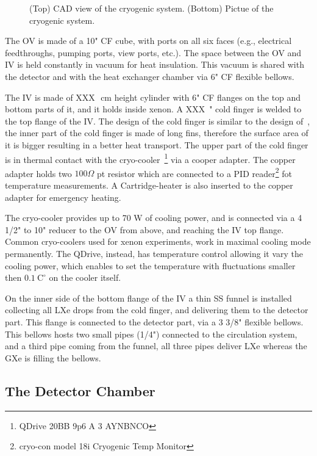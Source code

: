 \begin{figure}
\begin{subfigure}[b]{0.25\textheight}
    \end{subfigure}
        \caption{(Top) CAD view of the cryogenic system. (Bottom) Pictue of the cryogenic system. \label{fig:cryo}}
\end{figure}


The OV is made of a 10" CF cube, with ports on all six faces (e.g., electrical feedthroughs, pumping ports, view ports, etc.). The space between the OV and IV is held constantly in vacuum for heat insulation. This vacuum is shared with the detector and with the heat exchanger chamber via 6" CF flexible bellows.

The IV is made of XXX~\,cm height cylinder with 6" CF flanges on the top and bottom parts of it, and it holds inside xenon. A XXX~" cold finger is welded to the top flange of the IV. The design of the cold finger is similar to the design of~\cite{xe100_instr2012}, the inner part of the cold finger is made of long fins, therefore the surface area of it is bigger resulting in a better heat transport. The upper part of the cold finger is in thermal contact with the cryo-cooler~\footnote{QDrive 20BB 9p6 A 3 AYNBNCO} via a cooper adapter. The copper adapter holds two $100\Omega$ pt resistor which are connected to a PID reader\footnote{cryo-con model 18i Cryogenic Temp Monitor} fot temperature measurements. A Cartridge-heater is also inserted to the copper adapter for emergency heating. 

The cryo-cooler provides up to 70 W of cooling power, and is connected via a 4 1/2" to 10" reducer to the OV from above, and reaching the IV top flange. Common cryo-coolers used for xenon experiments, work in maximal cooling mode permanently. The QDrive, instead, has temperature control allowing it vary the cooling power, which enables to set the temperature with fluctuations smaller then $0.1~\mathrm{C^{\circ}}$ on the cooler itself.

On the inner side of the bottom flange of the IV a thin SS funnel is installed collecting all LXe drops from the cold finger, and delivering them to the  detector part. This flange is connected to the detector part, via a 3 3/8" flexible bellows. This bellows hosts two small pipes (1/4") connected to the circulation system, and a third pipe coming from the funnel, all three pipes deliver LXe whereas the GXe is filling the bellows.

\subsection{The Detector Chamber}
\label{subsec:det}

